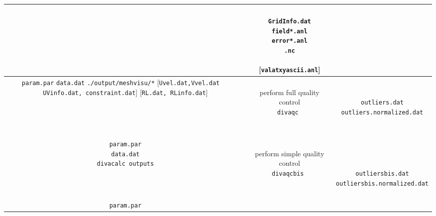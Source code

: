 \begin{table}
{{\begin{tabular}{c|c|c}
{{  { }  }
}
& 
\shortstack{
{  { }  } \\
{\tt GridInfo.dat} \\
{\tt field*.anl} \\
{\tt error*.anl} \\
{\tt *.nc} \\
{  { }  } \\
{[{\tt valatxyascii.anl}]}
} 
\\ \hline
 \shortstack{
 {  { }  } \\
 {\tt param.par} \\
 {\tt data.dat} \\
 {\tt ./output/meshvisu/*} \\
 {[{\tt Uvel.dat,Vvel.dat}} \\
 { $\quad ${\tt UVinfo.dat, constraint.dat}]} \\
 {[{\tt RL.dat, RLinfo.dat}]} 
}
 & 
\shortstack{
{  { }  } \\
{\sf perform full quality control} \\
{\tt divaqc    } 
\\
{  { }  } \\
{  { }  } \\
{  { }  }
}
& 
\shortstack{
{  { }  } \\
{  { }  } \\
{{\tt outliers.dat}} \\
{{\tt outliers.normalized.dat}} \\
{  { }  } \\
{  { }  } 
} 
\\ \hline
 \shortstack{
 {\tt param.par} \\
 {\tt data.dat} \\
{\tt divacalc outputs}
}
 & 
\shortstack{
{  { }  } \\
{\sf perform simple quality control} \\
{\tt divaqcbis } 
\\
{  { }  } \\
{  { }  } \\
{  { }  }
}
& 
\shortstack{
{  { }  } \\
{  { }  } \\
{  { }  } \\
{{\tt outliersbis.dat}} \\
{{\tt outliersbis.normalized.dat}} \\
{  { }  } \\
{  { }  } 
} 
\\ \hline
 \shortstack{
 {\tt param.par} \\
}
\end{tabular}}}
\end{table}
